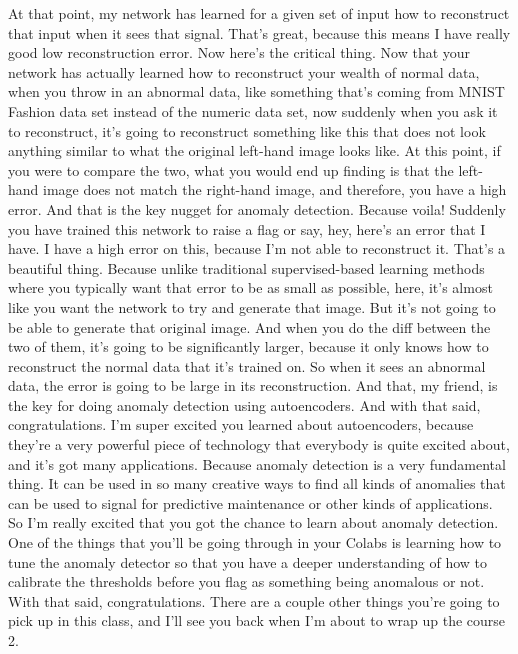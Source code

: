 At that point, my network has learned for a given set of input
how to reconstruct that input when it sees that signal.
That's great, because this means I have really good low reconstruction error.
Now here's the critical thing.
Now that your network has actually learned
how to reconstruct your wealth of normal data, when
you throw in an abnormal data, like something
that's coming from MNIST Fashion data set instead of the numeric data set,
now suddenly when you ask it to reconstruct,
it's going to reconstruct something like this
that does not look anything similar to what the original left-hand image looks
like.
At this point, if you were to compare the two, what you would end up finding
is that the left-hand image does not match the right-hand image,
and therefore, you have a high error.
And that is the key nugget for anomaly detection.
Because voila!
Suddenly you have trained this network to raise a flag or say, hey, here's
an error that I have.
I have a high error on this, because I'm not able to reconstruct it.
That's a beautiful thing.
Because unlike traditional supervised-based learning methods
where you typically want that error to be as small as possible, here,
it's almost like you want the network to try and generate that image.
But it's not going to be able to generate that original image.
And when you do the diff between the two of them,
it's going to be significantly larger, because it only
knows how to reconstruct the normal data that it's trained on.
So when it sees an abnormal data, the error
is going to be large in its reconstruction.
And that, my friend, is the key for doing anomaly detection
using autoencoders.
And with that said, congratulations.
I'm super excited you learned about autoencoders, because they're
a very powerful piece of technology that everybody is quite excited about,
and it's got many applications.
Because anomaly detection is a very fundamental thing.
It can be used in so many creative ways to find all kinds of anomalies
that can be used to signal for predictive maintenance
or other kinds of applications.
So I'm really excited that you got the chance
to learn about anomaly detection.
One of the things that you'll be going through in your Colabs
is learning how to tune the anomaly detector so
that you have a deeper understanding of how
to calibrate the thresholds before you flag as something being anomalous
or not.
With that said, congratulations.
There are a couple other things you're going to pick up in this class,
and I'll see you back when I'm about to wrap up the course 2.

